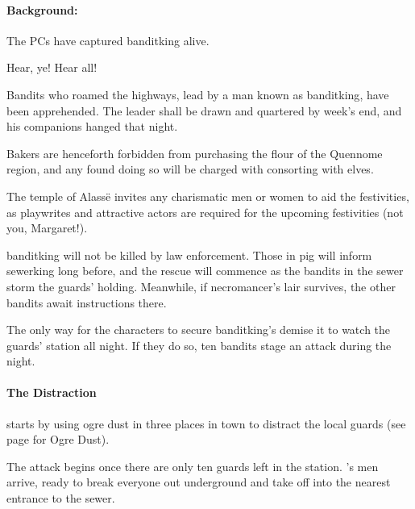 \begin{multicols}{2}
\stopcontents[Town]

\paragraph{Background:}
The PCs have captured \gls{banditking} alive.

\begin{boxtext}

  Hear, ye!  Hear all!

  Bandits who roamed the highways, lead by a man known as \gls{banditking}, have been apprehended.  The leader shall be drawn and quartered by week's end, and his companions hanged that night.

  Bakers are henceforth forbidden from purchasing the flour of the Quennome region, and any found doing so will be charged with consorting with elves.

  The temple of Alass\"e invites any charismatic men or women to aid the festivities, as playwrites and attractive actors are required for the upcoming festivities (not you, Margaret!).

\end{boxtext}

\Gls{banditking} will not be killed by law enforcement.
Those in \gls{pig} will inform \gls{sewerking} long before, and the rescue will commence as the bandits in the sewer storm the guards' holding.
Meanwhile, if \gls{necromancer}'s lair survives, the other bandits await instructions there.

The only way for the characters to secure \gls{banditking}'s demise it to watch the guards' station all night.
If they do so, ten bandits stage an attack during the night.

\paragraph{The Distraction} starts by using ogre dust in three places in town to distract the local guards (see page \pageref{ogredust} for Ogre Dust).

The attack begins once there are only ten guards left in the station.
's men arrive, ready to break everyone out underground and take off into the nearest entrance to the sewer.


\stopcontents[sq]

\stopcontents[Villages]

\end{multicols}
